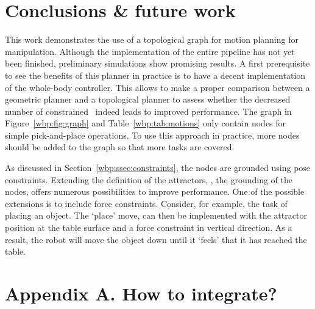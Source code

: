 \section{Conclusions \& future work}\label{wbp:sec:discussion}
This work demonstrates the use of a topological graph for motion planning for manipulation. Although the implementation of the entire pipeline has not yet been finished, preliminary simulations show promising results. 
A first prerequisite to see the benefits of this planner in practice is to have a decent implementation of the whole-body controller. This allows to make a proper comparison between a geometric planner and a topological planner to assess whether the decreased number of constrained \dofs\ indeed leads to improved performance.
The graph in Figure~\ref{wbp:fig:graph} and Table~\ref{wbp:tab:motions} only contain nodes for simple pick-and-place operations. 
To use this approach in practice, more nodes should be added to the graph so that more tasks are covered. 

As discussed in Section~\ref{wbp:ssec:constraints}, the nodes are grounded using pose constraints. 
Extending the definition of the attractors, \ie, the grounding of the nodes, offers numerous possibilities to improve performance. One of the possible extensions is to include force constraints.
Consider, for example, the task of placing an object. The `place' move, can then be implemented with the attractor position at the table surface and a force constraint in vertical direction. As a result, the robot will move the object down until it `feels' that it has reached the table. 

\newpage
\section{Appendix A. How to integrate?}

